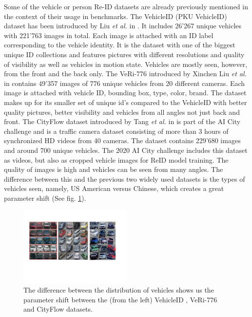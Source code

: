 \documentclass[conference]{IEEEtran} %
\begin{document}
		Some of the vehicle or person Re-ID datasets are already previously mentioned in the context of their usage in benchmarks. The VehicleID (PKU VehicleID) dataset has been introduced by Liu \textit{et al.} in \cite{liu2016deep}. It includes 26'267 unique vehicles with 221'763 images in total. Each image is attached with an ID label corresponding to the vehicle identity. It is the dataset with one of the biggest unique ID collections and features pictures with different resolutions and quality of visibility as well as vehicles in motion state. Vehicles are mostly seen, however, from the front and the back only. The VeRi-776 introduced by Xinchen Liu \textit{et al.} in \cite{liu2016deep2} contains 49'357 images of 776 unique vehicles from 20 different cameras. Each image is attached with vehicle ID, bounding box, type, color, brand. The dataset makes up for its smaller set of unique id's compared to the VehicleID with better quality pictures, better visibility and vehicles from all angles not just back and front. The CityFlow dataset introduced by Tang \textit{et al.} in \cite{tang2019cityflow} is part of the AI City challenge and is a traffic camera dataset consisting of more than 3 hours of synchronized HD videos from 40 cameras. The dataset contains 229'680 images and around 700 unique vehicles. The 2020 AI City challenge \cite{aicity2020data} includes this dataset as videos, but also as cropped vehicle images for ReID model training. The quality of images is high and vehicles can be seen from many angles. The difference between this and the previous two widely used datasets is the types of vehicles seen, namely, US American versus Chinese, which creates a great parameter shift (See fig. \ref{fig:fig2}).
	
	 \begin{figure}[t]
		\centering
		\includegraphics[width=0.5\textwidth]{re_id_diagramma_2.png} %
		\caption{The difference between the distribution of vehicles shows us the parameter shift between the (from the left) VehicleID \cite{liu2016deep}, VeRi-776 \cite{liu2016deep2} and CityFlow datasets.}
		\label{fig:fig2} %
	\end{figure}
	
\end{document}
